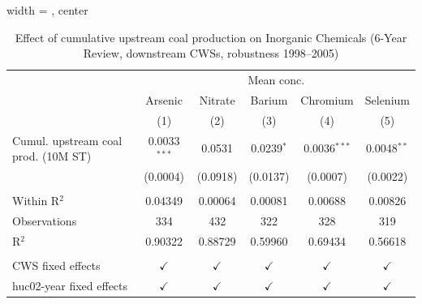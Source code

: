 
\begin{table}[htbp]
   
   \caption{\label{tab:6yr_huc02fe_inorg_2005} Effect of cumulative upstream coal production on Inorganic Chemicals (6-Year Review, downstream CWSs, robustness 1998--2005)}
   \bigskip
   
   \centering
   
   \begin{adjustbox}{width = \textwidth, center}
      
      
      \begin{tabular}{lccccc}
         \toprule
         
          & \multicolumn{5}{c}{Mean conc.}\\
         
                                             & Arsenic        & Nitrate       & Barium        & Chromium       & Selenium \\   
         
                                             & (1)            & (2)           & (3)           & (4)            & (5)\\  
         
         \midrule 
         Cumul. upstream coal prod. (10M ST) & 0.0033$^{***}$ & 0.0531        & 0.0239$^{*}$  & 0.0036$^{***}$ & 0.0048$^{**}$\\   
                                             & (0.0004)       & (0.0918)      & (0.0137)      & (0.0007)       & (0.0022)\\   
         
          \\
         
         Within R$^2$                        & 0.04349        & 0.00064       & 0.00081       & 0.00688        & 0.00826\\  
         Observations                        & 334            & 432           & 322           & 328            & 319\\  
         R$^2$                               & 0.90322        & 0.88729       & 0.59960       & 0.69434        & 0.56618\\  
         
          \\
         
         CWS fixed effects                   & $\checkmark$   & $\checkmark$  & $\checkmark$  & $\checkmark$   & $\checkmark$\\   
         huc02-year fixed effects            & $\checkmark$   & $\checkmark$  & $\checkmark$  & $\checkmark$   & $\checkmark$\\   
         

\end{tabular}
\end{adjustbox}
\end{table}
